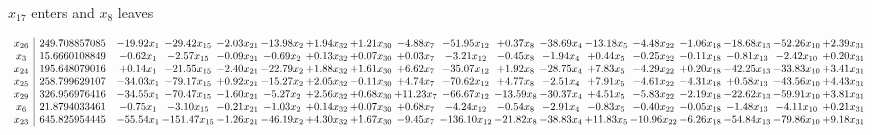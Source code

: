 \documentclass[9pt]{article}
\begin{document}
 $ x_{17} $ enters and $ x_{8} $ leaves 

 \[\begin{array}{c| c c@{\hskip 2pt} c@{\hskip 2pt} c@{\hskip 2pt} c@{\hskip 2pt} c@{\hskip 2pt} c@{\hskip 2pt} c@{\hskip 2pt} c@{\hskip 2pt} c@{\hskip 2pt} c@{\hskip 2pt} c@{\hskip 2pt} c@{\hskip 2pt} c@{\hskip 2pt} c@{\hskip 2pt} c@{\hskip 2pt} c@{\hskip 2pt} }
 x_{26}   &  249.708857085 & -19.92 x_{1} & -29.42 x_{15} & -2.03 x_{21} & -13.98 x_{2} & +  1.94 x_{32} & +  1.21 x_{30} & -4.88 x_{7} & -51.95 x_{12} & +  0.37 x_{8} & -38.69 x_{4} & -13.18 x_{5} & -4.48 x_{22} & -1.06 x_{18} & -18.68 x_{13} & -52.26 x_{10} & +  2.39 x_{31}\\
 x_{3}   &  15.6660108849 & -0.62 x_{1} & -2.57 x_{15} & -0.09 x_{21} & -0.69 x_{2} & +  0.13 x_{32} & +  0.07 x_{30} & +  0.03 x_{7} & -3.21 x_{12} & -0.45 x_{8} & -1.94 x_{4} & +  0.44 x_{5} & -0.25 x_{22} & -0.11 x_{18} & -0.81 x_{13} & -2.42 x_{10} & +  0.20 x_{31}\\
 x_{24}   &  195.648079016 & +  0.14 x_{1} & -21.55 x_{15} & -2.40 x_{21} & -22.79 x_{2} & +  1.88 x_{32} & +  1.61 x_{30} & +  6.62 x_{7} & -35.07 x_{12} & +  1.92 x_{8} & -28.75 x_{4} & +  7.83 x_{5} & -4.29 x_{22} & +  0.20 x_{18} & -42.25 x_{13} & -33.83 x_{10} & +  3.41 x_{31}\\
 x_{25}   &  258.799629107 & -34.03 x_{1} & -79.17 x_{15} & +  0.92 x_{21} & -15.27 x_{2} & +  2.05 x_{32} & -0.11 x_{30} & +  4.74 x_{7} & -70.62 x_{12} & +  4.77 x_{8} & -2.51 x_{4} & +  7.91 x_{5} & -4.61 x_{22} & -4.31 x_{18} & +  0.58 x_{13} & -43.56 x_{10} & +  4.43 x_{31}\\
 x_{29}   &  326.956976416 & -34.55 x_{1} & -70.47 x_{15} & -1.60 x_{21} & -5.27 x_{2} & +  2.56 x_{32} & +  0.68 x_{30} & + 11.23 x_{7} & -66.67 x_{12} & -13.59 x_{8} & -30.37 x_{4} & +  4.51 x_{5} & -5.83 x_{22} & -2.19 x_{18} & -22.62 x_{13} & -59.91 x_{10} & +  3.81 x_{31}\\
 x_{6}   &  21.8794033461 & -0.75 x_{1} & -3.10 x_{15} & -0.21 x_{21} & -1.03 x_{2} & +  0.14 x_{32} & +  0.07 x_{30} & +  0.68 x_{7} & -4.24 x_{12} & -0.54 x_{8} & -2.91 x_{4} & -0.83 x_{5} & -0.40 x_{22} & -0.05 x_{18} & -1.48 x_{13} & -4.11 x_{10} & +  0.21 x_{31}\\
 x_{23}   &  645.825954445 & -55.54 x_{1} & -151.47 x_{15} & -1.26 x_{21} & -46.19 x_{2} & +  4.30 x_{32} & +  1.67 x_{30} & -9.45 x_{7} & -136.10 x_{12} & -21.82 x_{8} & -38.83 x_{4} & + 11.83 x_{5} & -10.96 x_{22} & -6.26 x_{18} & -54.84 x_{13} & -79.86 x_{10} & +  9.18 x_{31}\\

\end{array}\]
\end{document}
